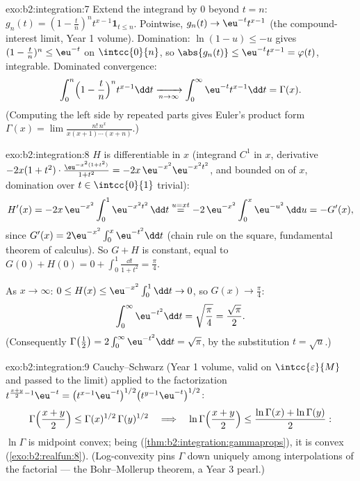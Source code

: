 \begin{solution}{exo:b2:integration:7}
Extend the integrand by $0$ beyond $t = n$: $g_n(t) = (1 -
\frac tn)^n t^{x-1}\mathbf{1}_{t \leq n}$. Pointwise, $g_n(t) \to
\eu^{-t}t^{x-1}$ (the compound-interest limit, Year 1 volume).
Domination: $\ln(1 - u) \leq -u$ gives $(1 - \frac tn)^n \leq
\eu^{-t}$ on $\intcc{0}{n}$, so $\abs{g_n(t)} \leq
\eu^{-t}t^{x-1} = \varphi(t)$, integrable. Dominated convergence:
\[
\int_0^n \Bigl(1 - \frac tn\Bigr)^n t^{x-1}\dd t
\xrightarrow[n\to\infty]{} \int_0^\infty \eu^{-t}t^{x-1}\dd t
= \Gamma(x) .
\]
(Computing the left side by repeated parts gives Euler's product
form $\Gamma(x) = \lim \frac{n!\,n^x}{x(x+1)\cdots(x+n)}$.)
\end{solution}

\begin{solution}{exo:b2:integration:8}
$H$ is differentiable in $x$ (integrand $C^1$ in $x$, derivative
$-2x(1+t^2)\cdot\frac{\eu^{-x^2(1+t^2)}}{1+t^2} =
-2x\,\eu^{-x^2}\eu^{-x^2t^2}$,  and bounded on 
of $x$, domination over $t \in \intcc{0}{1}$ trivial):
\[
H'(x) = -2x\,\eu^{-x^2}\int_0^1 \eu^{-x^2t^2}\,\dd t
\overset{u = xt}{=} -2\,\eu^{-x^2}\int_0^x \eu^{-u^2}\,\dd u
= -G'(x),
\]
since $G'(x) = 2\eu^{-x^2}\int_0^x \eu^{-t^2}\dd t$ (chain rule on
the square, fundamental theorem of calculus). So $G + H$ is
constant, equal to $G(0) + H(0) = 0 + \int_0^1 \frac{\dd t}{1+t^2}
= \frac\pi4$.

As $x \to \infty$: $0 \leq H(x) \leq \eu^{-x^2}\int_0^1 \dd t \to
0$, so $G(x) \to \frac\pi4$:
\[
\int_0^\infty \eu^{-t^2}\dd t = \sqrt{\frac\pi4} =
\frac{\sqrt\pi}{2} .
\]
(Consequently $\Gamma\bigl(\frac12\bigr) = 2\int_0^\infty
\eu^{-t^2}\dd t = \sqrt\pi$, by the substitution $t = \sqrt u$.)
\end{solution}

\begin{solution}{exo:b2:integration:9}
Cauchy--Schwarz (Year 1 volume, valid on $\intcc{\varepsilon}{M}$
and passed to the limit) applied to the factorization
$t^{\frac{x+y}{2}-1}\eu^{-t} = \bigl(t^{x-1}\eu^{-t}\bigr)^{1/2}
\bigl(t^{y-1}\eu^{-t}\bigr)^{1/2}$:
\[
\Gamma\Bigl(\frac{x+y}{2}\Bigr) \leq
\Gamma(x)^{1/2}\,\Gamma(y)^{1/2}
\quad\Longrightarrow\quad
\ln\Gamma\Bigl(\frac{x+y}{2}\Bigr) \leq \frac{\ln\Gamma(x) +
\ln\Gamma(y)}{2} :
\]
$\ln\Gamma$ is midpoint convex; being 
(\cref{thm:b2:integration:gammaprops}), it is convex
(\cref{exo:b2:realfun:8}). (Log-convexity pins $\Gamma$ down
uniquely among interpolations of the factorial --- the
Bohr--Mollerup theorem, a Year 3 pearl.)
\end{solution}

